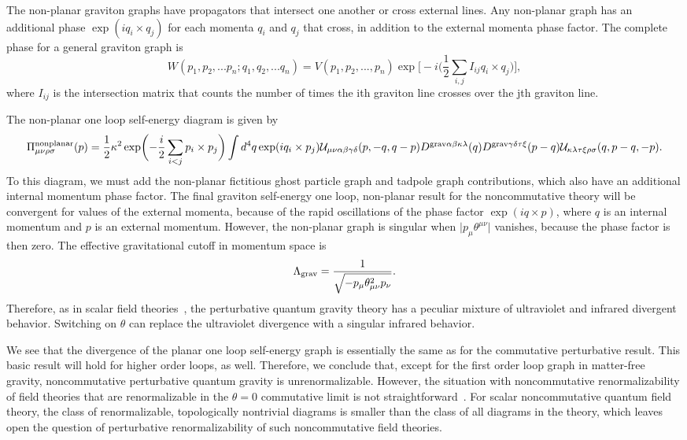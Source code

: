 \documentclass[a4paper,10pt]{article}
\begin{document}
The non-planar graviton graphs have propagators that intersect one another
or cross external lines. Any non-planar graph has an additional phase
$\exp(iq_i\times q_j)$ for each momenta $q_i$ and $q_j$ that cross, in
addition to the external momenta phase factor. The complete
phase for a general graviton graph is
\begin{equation}
W(p_1,p_2,...p_n;q_1,q_2,...q_n)=V(p_1,p_2,...,p_n)
\exp\biggl[-i\biggl(\frac{1}{2}\sum_{i,j}I_{ij}q_i\times q_j\biggr)\biggr],
\end{equation}
where $I_{ij}$ is the intersection matrix that counts the number of times
the ith graviton line crosses over the jth graviton line.

The non-planar one loop self-energy diagram is given by
\begin{equation}
\Pi^{\rm nonplanar}_{\mu\nu\rho\sigma}(p)
=\frac{1}{2}\kappa^2\exp\biggl(-\frac{i}{2}\sum_{i<j}p_i\times
p_j\biggr)\int d^4q \exp(iq_i\times p_j)
{\cal U}_{\mu\nu\alpha\beta\gamma\delta}(p,-q,q-p)
$$ $$
D^{{\rm grav}\alpha\beta\kappa\lambda}(q)
D^{{\rm grav}\gamma\delta\tau\xi}(p-q){\cal
U}_{\kappa\lambda\tau\xi\rho\sigma}(q,p-q,-p).
\end{equation}
To this diagram, we must add the non-planar fictitious
ghost particle graph and tadpole graph contributions, which also have an
additional internal momentum phase factor. The final graviton self-energy
one loop, non-planar result for the noncommutative theory will be
convergent for values of the external momenta, because of the rapid
oscillations of the phase factor $\exp(iq\times p)$, where $q$ is an
internal momentum and $p$ is an external momentum. However, the non-planar
graph is singular when $\vert p_\mu\theta^{\mu\nu}\vert$ vanishes, because
the phase factor is then zero. The effective gravitational cutoff in
momentum space is
\begin{equation}
\Lambda_{\rm grav}=\frac{1}{\sqrt{-p_\mu\theta^2_{\mu\nu}p_\nu}}.
\end{equation}
Therefore, as in scalar field theories~\cite{Minwalla}, the perturbative
quantum gravity theory has a peculiar mixture of ultraviolet and infrared
divergent behavior. Switching on $\theta$ can replace the ultraviolet
divergence with a singular infrared behavior.

We see that the divergence of the planar one loop self-energy graph is
essentially the same as for the commutative perturbative result.
This basic result will hold for higher order loops, as well. Therefore, we
conclude that, except for the first order loop graph in matter-free
gravity, noncommutative perturbative quantum gravity is unrenormalizable.
However, the situation with noncommutative renormalizability of field theories that
are renormalizable in the $\theta=0$ commutative limit is not
straightforward~\cite{Chepelev,Minwalla}. For scalar noncommutative
quantum field theory, the class of renormalizable, topologically nontrivial
diagrams is smaller than the class of all diagrams in the theory, which
leaves open the question of perturbative renormalizability of such
noncommutative field theories.
\end{document}
